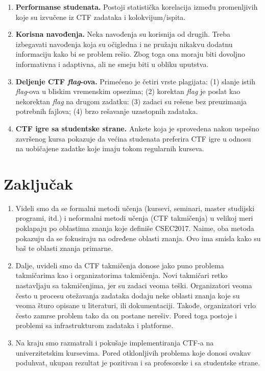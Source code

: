 \documentclass[12pt, a4paper, twocolumn]{article}
\begin{document}
\begin{enumerate}
    \item \textbf{Performanse studenata.} Postoji statistička korelacija 
        između promenljivih koje su izvučene iz CTF zadataka i 
        kolokvijum/ispita. 
    \item \textbf{Korisna navođenja.} Neka navođenja su korisnija od
        drugih. Treba izbegavati navođenja koja su očigledna i ne pružaju
        nikakvu dodatnu informaciju kako bi se problem rešio. Zbog toga ona
        moraju biti dovoljno informativna i adaptivna, ali ne smeju biti u 
        obliku uputstva.
    \item \textbf{Deljenje CTF \emph{flag}-ova.} Primećeno je četiri vrste
        plagijata: (1) slanje istih \emph{flag}-ova u bliskim vremenskim
        opsezima; (2) korektan \emph{flag} je poslat kao nekorektan
        \emph{flag} na drugom zadatku: (3) zadaci su rešene bez preuzimanja
        potrebnih fajlova; (4) brzo rešavanje uzastopnih zadataka.
    \item \textbf{CTF igre sa studentske strane.} Ankete koja je sprovedena 
        nakon uspešno završenog kursa pokazuje da većina studenata preferira
        CTF igre u odnosu na uobičajene zadatke koje imaju tokom regularnih
        kurseva.
\end{enumerate}

\section{Zaključak}

\begin{enumerate}
    \item Videli smo da se formalni metodi učenja (kursevi, seminari, master 
        studijski programi, itd.) i neformalni metodi učenja (CTF takmičenja) 
        u velikoj meri poklapaju po oblastima znanja koje definiše CSEC2017. 
        Naime, oba metoda pokazuju da se fokusiraju na određene oblasti 
        znanja. Ovo ima smisla kako su baš te oblasti znanja primarne.
    \item Dalje, uvideli smo da CTF takmičenja donose jako puno problema 
        takmičarima kao i organizatorima takmičenja. Novi takmičari retko 
        nastavljaju sa takmičenjima, jer su zadaci veoma teški. Organizatori 
        veoma često u procesu otežavanja zadataka dodaju neke oblasti znanja 
        koje su veoma šturo opisane u literaturi, ili dokumentaciji. Takođe, 
        organizatori vrlo često zamrse problem tako da on postane nerešiv. 
        Pored toga postoje i problemi sa infrastrukturom zadataka i platforme.
    \item Na kraju smo razmatrali i pokušaje implementiranja CTF-a na 
        univerzitetskim kursevima. Pored otklonljivih problema koje donosi 
        ovakav poduhvat, ukupan rezultat je pozitivan i sa profesorske i sa 
        studentske strane. 
\end{enumerate}
\end{document}
